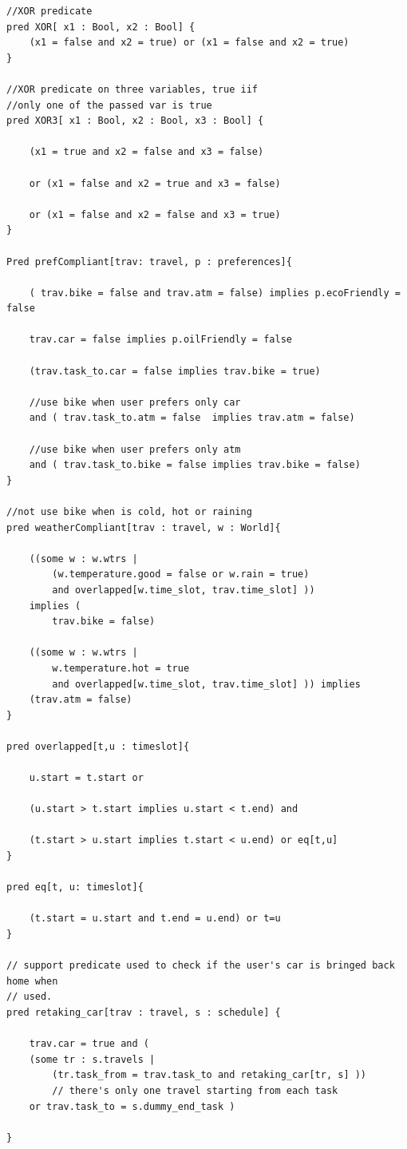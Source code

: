 \begin{verbatim}
//XOR predicate
pred XOR[ x1 : Bool, x2 : Bool] {
    (x1 = false and x2 = true) or (x1 = false and x2 = true) 
}

//XOR predicate on three variables, true iif 
//only one of the passed var is true 
pred XOR3[ x1 : Bool, x2 : Bool, x3 : Bool] {

    (x1 = true and x2 = false and x3 = false) 

    or (x1 = false and x2 = true and x3 = false) 
    
    or (x1 = false and x2 = false and x3 = true)      
}

Pred prefCompliant[trav: travel, p : preferences]{

    ( trav.bike = false and trav.atm = false) implies p.ecoFriendly = false

    trav.car = false implies p.oilFriendly = false

    (trav.task_to.car = false implies trav.bike = true)

    //use bike when user prefers only car
    and ( trav.task_to.atm = false  implies trav.atm = false)

    //use bike when user prefers only atm
    and ( trav.task_to.bike = false implies trav.bike = false)
}

//not use bike when is cold, hot or raining
pred weatherCompliant[trav : travel, w : World]{

    ((some w : w.wtrs |
        (w.temperature.good = false or w.rain = true) 
        and overlapped[w.time_slot, trav.time_slot] ))
    implies	(
        trav.bike = false)

    ((some w : w.wtrs | 
        w.temperature.hot = true 
        and overlapped[w.time_slot, trav.time_slot] )) implies
    (trav.atm = false)
}

pred overlapped[t,u : timeslot]{

    u.start = t.start or
	
    (u.start > t.start implies u.start < t.end) and
	
    (t.start > u.start implies t.start < u.end) or eq[t,u]
}

pred eq[t, u: timeslot]{

    (t.start = u.start and t.end = u.end) or t=u
}

// support predicate used to check if the user's car is bringed back home when
// used.
pred retaking_car[trav : travel, s : schedule] {

    trav.car = true and (
    (some tr : s.travels | 
        (tr.task_from = trav.task_to and retaking_car[tr, s] )) 
        // there's only one travel starting from each task
	or trav.task_to = s.dummy_end_task )

}
\end{verbatim}
